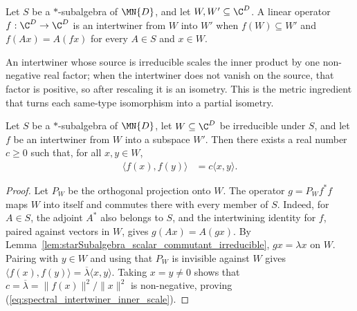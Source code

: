 \begin{definition}%
    \label{def:starSubalgebra_intertwiner}
    \leanok
    Let $S$ be a $*$-subalgebra of $\MN{D}$, and let
    $W,W'\subseteq\C^D$. A linear operator $f:\C^D\to\C^D$ is an
    intertwiner from $W$ into $W'$ when $f(W)\subseteq W'$ and
    $f(Ax)=A(fx)$ for every $A\in S$ and $x\in W$.
\end{definition}

An intertwiner whose source is irreducible scales the inner product by one
non-negative real factor; when the intertwiner does not vanish on the source,
that factor is positive, so after rescaling it is an isometry. This is the
metric ingredient that turns each same-type isomorphism into a partial
isometry.

\begin{lemma}%
    \label{lem:starSubalgebra_intertwiner_inner_scale}
    \leanok
    Let $S$ be a $*$-subalgebra of $\MN{D}$, let
    $W\subseteq\C^D$ be irreducible under $S$, and let $f$ be an
    intertwiner from $W$ into a subspace $W'$. Then there exists a real
    number $c\geq0$ such that, for all $x,y\in W$,
    \begin{align}
        \langle f(x),f(y)\rangle
        &=c\langle x,y\rangle.
        \label{eq:spectral_intertwiner_inner_scale}
    \end{align}
\end{lemma}

\begin{proof}
    \leanok
    Let $P_W$ be the orthogonal projection onto $W$. The operator
    $g=P_Wf^*f$ maps $W$ into itself and commutes there with every member of
    $S$. Indeed, for $A\in S$, the adjoint $A^*$ also belongs to $S$, and
    the intertwining identity for $f$, paired against vectors in $W$, gives
    $g(Ax)=A(gx)$. By
    Lemma~\ref{lem:starSubalgebra_scalar_commutant_irreducible},
    $gx=\lambda x$ on $W$. Pairing with $y\in W$ and using that $P_W$ is
    invisible against $W$ gives
    $\langle f(x),f(y)\rangle
    =\overline{\lambda}\langle x,y\rangle$.
    Taking $x=y\neq0$ shows that
    $c=\overline{\lambda}=\lVert f(x)\rVert^2/\lVert x\rVert^2$ is
    non-negative, proving (\ref{eq:spectral_intertwiner_inner_scale}).
\end{proof}

